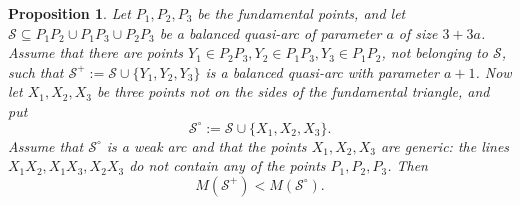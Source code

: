 \documentclass{article}
\newtheorem{proposition}{Proposition}
\begin{document}
\begin{proposition}
\label{lem:three-point-side-extension}
Let $P_1,P_2,P_3$ be the fundamental points, and let $
\mathcal{S}\subseteq P_1P_2\cup P_1P_3\cup P_2P_3$
be a balanced quasi-arc of parameter $a$ of size $3+3a$. 
Assume that there are points
$Y_1\in P_2P_3,
Y_2\in P_1P_3,
Y_3\in P_1P_2$,
not belonging to $\mathcal{S}$, such that $\mathcal{S^+}:=\mathcal{S}\cup\{Y_1,Y_2,Y_3\}$ is a balanced quasi-arc with parameter $a+1$.  Now let $X_1,X_2,X_3$ be three points not on the sides of the fundamental triangle, and put
\[
\mathcal{S^{\circ}}:=\mathcal{S}\cup\{X_1,X_2,X_3\}.
\]
Assume that $\mathcal{S}^{\circ}$ is a weak arc and that the points $X_1,X_2,X_3$ are generic: {the lines $X_1X_2,X_1X_3,X_2X_3$ do not contain any of the points $P_1,P_2,P_3$.}  Then
\[
M(\mathcal{S}^+) < M(\mathcal{S}^{\circ}).
\]
\end{proposition}
\end{document}
